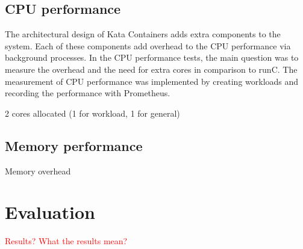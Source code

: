 \subsection{CPU performance}

The architectural design of Kata Containers adds extra components to the system. Each of these components add overhead to the CPU performance via background processes. In the CPU performance tests, the main question was to measure the overhead and the need for extra cores in comparison to runC. The measurement of CPU performance was implemented by creating workloads and recording the performance with Prometheus. 

2 cores allocated (1 for workload, 1 for general)

\subsection{Memory performance}

Memory overhead

\section{Evaluation}

\textcolor{red}{Results?}
\textcolor{red}{What the results mean?}